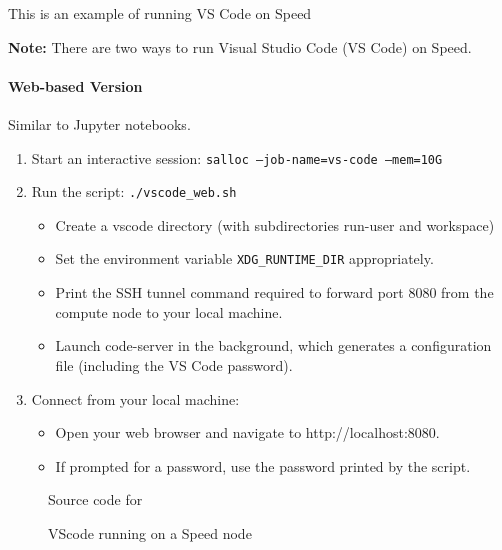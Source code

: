 This is an example of running VS Code on Speed

\textbf{Note: } There are two ways to run Visual Studio Code (VS Code) on Speed.

\paragraph{Web-based Version}
\label{sect:web-based-vscode}
\noindent Similar to Jupyter notebooks.

\begin{enumerate}
    \item Start an interactive session: \texttt{salloc --job-name=vs-code --mem=10G}
    \item Run the script: \texttt{./vscode_web.sh}
    \begin{itemize}
        \item Create a vscode directory (with subdirectories run-user and workspace)
        \item Set the environment variable \texttt{XDG\_RUNTIME\_DIR} appropriately. 
        \item Print the SSH tunnel command required to forward port 8080 from the compute node to your local machine.
        \item Launch code-server in the background, which generates a configuration file (including the VS Code password).
    \end{itemize}
    \item Connect from your local machine:
    \begin{itemize}
        \item Open your web browser and navigate to http://localhost:8080.
        \item If prompted for a password, use the password printed by the script.
    \end{itemize}
\end{enumerate}

\small
\begin{figure}[htpb]
    
    \caption{Source code for }
    \label{fig:vscode_web.sh}
\end{figure}
\normalsize

\begin{figure}[htbp]
	\centering
	\caption{VScode running on a Speed node}
	\label{fig:vscode}
\end{figure}

